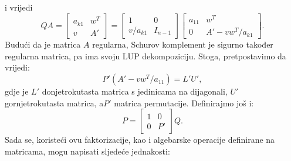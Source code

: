 \documentclass[a4paper,12pt,oneside]{article}
\begin{document}
i vrijedi
$$
QA = \left[\begin{array}{cc}a_{k1} & w^{T} \\
	v & A' \end{array}\right] =  \left[\begin{array}{cc}1 & 0 \\
	v/a_{k1} &I_{n-1} \end{array}\right]  \left[\begin{array}{cc}a_{11} & w^T \\
	0 &A' - vw^T/a_{k1}\end{array}\right].
$$
\newline \newline
\noindent Budući da je matrica $A$ regularna, Schurov komplement je sigurno također regularna matrica, pa ima svoju LUP dekompoziciju. \newline\newline
Stoga, pretpostavimo da vrijedi:
$$P'(A' - vw^T/a_{11}) = L'U',$$
gdje je $L'$ donjetrokutasta matrica s jedinicama na dijagonali, $U'$ gornjetrokutasta matrica, a$P'$ matrica permutacije.
\newline\newline
\noindent Definirajmo još i:
$$
P = \left[\begin{array}{cc}1 &0 \\
	0 & P' \end{array}\right]Q.
$$
\noindent Sada se, koristeći ovu faktorizacije, kao i algebarske operacije definirane na matricama, mogu napisati sljedeće jednakosti:
\end{document}

